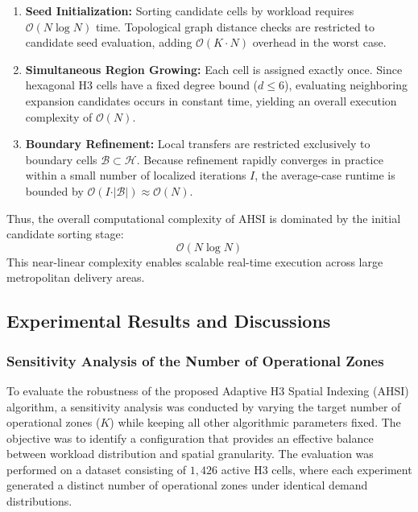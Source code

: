 \documentclass{article}
\begin{document}
\begin{enumerate}
    \item \textbf{Seed Initialization:} Sorting candidate cells by workload requires $\mathcal{O}(N \log N)$ time. Topological graph distance checks are restricted to candidate seed evaluation, adding $\mathcal{O}(K \cdot N)$ overhead in the worst case.
    \item \textbf{Simultaneous Region Growing:} Each cell is assigned exactly once. Since hexagonal H3 cells have a fixed degree bound ($d \le 6$), evaluating neighboring expansion candidates occurs in constant time, yielding an overall execution complexity of $\mathcal{O}(N)$.
    \item \textbf{Boundary Refinement:} Local transfers are restricted exclusively to boundary cells $\mathcal{B} \subset \mathcal{H}$. Because refinement rapidly converges in practice within a small number of localized iterations $I$, the average-case runtime is bounded by $\mathcal{O}(I \cdot \vert{}\mathcal{B}\vert{}) \approx \mathcal{O}(N)$.
\end{enumerate}

Thus, the overall computational complexity of AHSI is dominated by the initial candidate sorting stage:
$$\mathcal{O}(N \log N)$$
This near-linear complexity enables scalable real-time execution across large metropolitan delivery areas.

\subsection{Experimental Results and Discussions}
\subsubsection{Sensitivity Analysis of the Number of Operational Zones}
\label{sec:zone_sensitivity_analysis}

To evaluate the robustness of the proposed Adaptive H3 Spatial Indexing (AHSI) algorithm, a sensitivity analysis was conducted by varying the target number of operational zones ($K$) while keeping all other algorithmic parameters fixed. The objective was to identify a configuration that provides an effective balance between workload distribution and spatial granularity. The evaluation was performed on a dataset consisting of $1,426$ active H3 cells, where each experiment generated a distinct number of operational zones under identical demand distributions.
\end{document}
